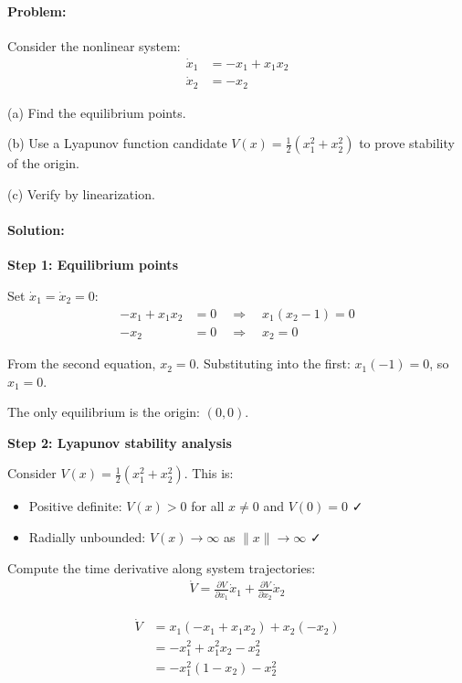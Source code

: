 \documentclass[11pt,a4paper]{article}
\begin{document}
\paragraph{Problem:} Consider the nonlinear system:
\begin{align}
\dot{x}_1 &= -x_1 + x_1 x_2 \\
\dot{x}_2 &= -x_2
\end{align}

(a) Find the equilibrium points.

(b) Use a Lyapunov function candidate $V(x) = \frac{1}{2}(x_1^2 + x_2^2)$ to prove stability of the origin.

(c) Verify by linearization.

\paragraph{Solution:}

\textbf{Step 1: Equilibrium points}

Set $\dot{x}_1 = \dot{x}_2 = 0$:
\begin{align}
-x_1 + x_1 x_2 &= 0 \quad \Rightarrow \quad x_1(x_2 - 1) = 0 \\
-x_2 &= 0 \quad \Rightarrow \quad x_2 = 0
\end{align}

From the second equation, $x_2 = 0$. Substituting into the first: $x_1(-1) = 0$, so $x_1 = 0$.

The only equilibrium is the origin: $(0, 0)$.

\textbf{Step 2: Lyapunov stability analysis}

Consider $V(x) = \frac{1}{2}(x_1^2 + x_2^2)$. This is:
\begin{itemize}
\item Positive definite: $V(x) > 0$ for all $x \neq 0$ and $V(0) = 0$ ✓
\item Radially unbounded: $V(x) \to \infty$ as $\|x\| \to \infty$ ✓
\end{itemize}

Compute the time derivative along system trajectories:
\begin{align}
\dot{V} = \frac{\partial V}{\partial x_1}\dot{x}_1 + \frac{\partial V}{\partial x_2}\dot{x}_2
\end{align}

\begin{align}
\dot{V} &= x_1(-x_1 + x_1 x_2) + x_2(-x_2) \\
&= -x_1^2 + x_1^2 x_2 - x_2^2 \\
&= -x_1^2(1 - x_2) - x_2^2
\end{align}
\end{document}
